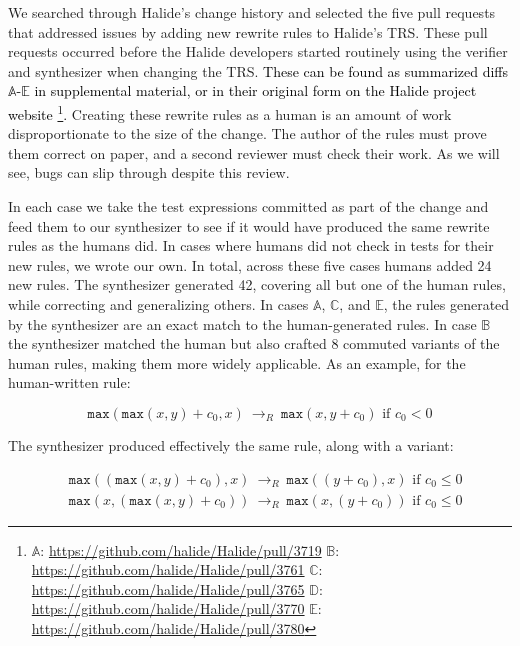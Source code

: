 \documentclass[acmsmall]{acmart}\settopmatter{}
\newcommand{\modified}[1]{\textcolor{black}{{#1}}}
\newcommand{\hmax}[0]{\texttt{max}}
\newcommand{\rewrites}[0]{\:\rightarrow_{R}\:}
\newcommand{\pred}[0]{\textrm{ if }}
\begin{document}


We searched through Halide’s change history and selected the five pull requests that addressed issues by adding new rewrite rules to Halide’s TRS. These pull requests occurred before the Halide developers started routinely using the verifier and synthesizer when changing the TRS. \modified{These can be found as summarized diffs $\mathbb{A}$-$\mathbb{E}$ in supplemental material, or in their original form on the Halide project website
\footnote{
$\mathbb{A}$: \url{https://github.com/halide/Halide/pull/3719}
$\mathbb{B}$: \url{https://github.com/halide/Halide/pull/3761}
$\mathbb{C}$: \url{https://github.com/halide/Halide/pull/3765}
$\mathbb{D}$: \url{https://github.com/halide/Halide/pull/3770}
$\mathbb{E}$: \url{https://github.com/halide/Halide/pull/3780}
}.}
Creating these rewrite rules as a human is an amount of work disproportionate to the size of the change. The author of the rules must prove them correct on paper, and a second reviewer must check their work. As we will see, bugs can slip through despite this review. 

In each case we take the test expressions committed as part of the change and feed them to our synthesizer to see if it would have produced the same rewrite rules as the humans did. In cases where humans did not check in tests for their new rules, we wrote our own. In total, across these five cases humans added 24 new rules. The synthesizer generated 42, covering all but one of the human rules, while correcting and generalizing others. In cases $\mathbb{A}$, $\mathbb{C}$, and $\mathbb{E}$, the rules generated by the synthesizer are an exact match to the human-generated rules. In case $\mathbb{B}$ the synthesizer matched the human but also crafted 8 commuted variants of the human rules, making them more widely applicable. As an example, for the human-written rule:

\[
\hmax(\hmax(x, y) + c_0, x) \rewrites \hmax(x, y + c_0) \pred c_0 < 0
\]

The synthesizer produced effectively the same rule, along with a variant:

\begin{align*}
& \hmax((\hmax(x, y) + c_0), x) \rewrites \hmax((y + c_0), x) \pred c_0 \leq 0 \\
& \hmax(x, (\hmax(x, y) + c_0)) \rewrites \hmax(x, (y + c_0)) \pred c_0 \leq 0
\end{align*}
\end{document}
